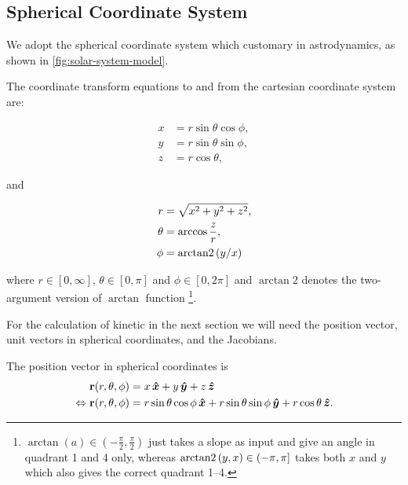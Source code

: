 \subsection{Spherical Coordinate System}
We adopt the spherical coordinate system which customary in astrodynamics, as shown in \cref{fig:solar-system-model}.

The coordinate transform equations to and from the cartesian coordinate system are:

\begin{align}
    x &= r \sin{\theta}\cos{\phi}, \label{eq:x(q)} \\
    y &= r \sin{\theta}\sin{\phi}, \label{eq:y(q)}\\
    z &= r \cos{\theta}, \label{eq:z(q)}
\end{align}

and

\begin{align}
    r &= \sqrt{x^2 + y^2 + z^2}, \label{eq:r(x,y,z)}\\
    \theta &= \arccos{\frac{z}{r}}, \label{eq:theta(x,y,z)}\\
    \phi &= 
    \operatorname{arctan2}{(y/x)} \\
    \label{eq:phi(x,y,z)}
\end{align}

where \(r \in [0, \infty]\), \(\theta \in [0, \pi]\) and \(\phi \in [0, 2\pi]\) and \(\arctan2\) denotes the two-argument version of \(\arctan\) function \footnote{\(\arctan{(a)} \in (-\frac{\pi}{2}, \frac{\pi}{2})\) just takes a slope as input and give an angle in quadrant 1 and 4 only, whereas \(\operatorname{arctan2}{(y,x)} \in (-\pi, \pi]\) takes both \(x\) and \(y\) which also gives the correct quadrant 1–4.}\cite{WikiAtan2}.

For the calculation of kinetic in the next section we will need the position vector, unit vectors in spherical coordinates, and the Jacobians.

The position vector in spherical coordinates is
\begin{align}
    \mathbf{r}(r, \theta, \phi) &= x \operatorname{}\!\bm{\hat{x}} + y \operatorname{}\!\bm{\hat{y}} + z \operatorname{}\!\bm{\hat{z}} \\
    \Leftrightarrow \mathbf{r}(r, \theta, \phi) &= r \sin{\theta}\cos{\phi} \operatorname{}\!\bm{\hat{x}} + r \sin{\theta}\sin{\phi} \operatorname{}\!\bm{\hat{y}} + r \cos{\theta} \operatorname{}\!\bm{\hat{z}}. \label{eq:position-vec-spherical}
\end{align}

